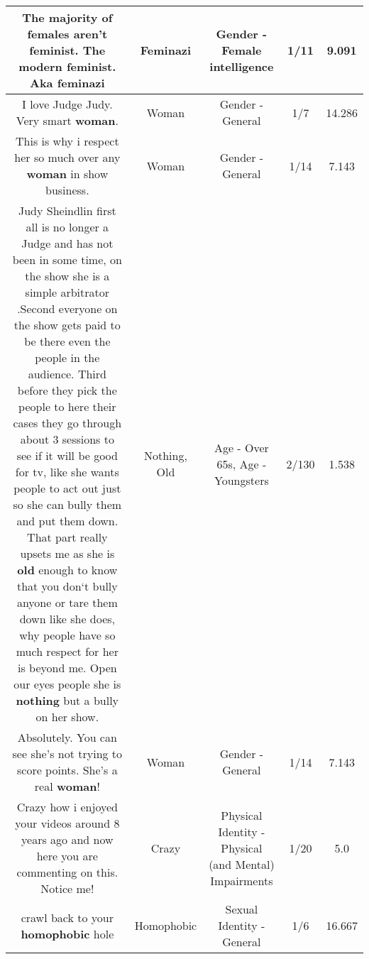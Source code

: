 \documentclass[11pt]{article}
\newlength\mylength
\begin{document}
\begin{center}
\begin{longtable}{|C{.65\mylength}|C{.30\mylength}|C{.12\mylength}|C{.12\mylength}|C{.12\mylength}|}
  \small The majority of females aren't feminist. The modern feminist. Aka feminazi\normalsize   & Feminazi & Gender - Female intelligence & 1/11 & 9.091 \\  \hline
  \small I love Judge Judy. Very smart \textbf{woman}.\normalsize   & Woman & Gender - General & 1/7 & 14.286 \\  \hline
  \small This is why i respect her so much over any \textbf{woman} in show business.\normalsize   & Woman & Gender - General & 1/14 & 7.143 \\  \hline
  \small Judy Sheindlin first all is no longer a Judge and has not been in some time, on the show she is a simple arbitrator .Second everyone on the show gets paid to be there even the people in the audience. Third before they pick the people to here their cases they go through about 3 sessions to see if it will be good for tv, like she wants people to act out just so she can bully them and put them down. That part really upsets me as she is \textbf{old} enough to know that you don`t bully anyone or tare them down like she does, why people have so much respect for her is beyond me. Open our eyes people she is \textbf{nothing} but a bully on her show.\normalsize   & Nothing, Old & Age - Over 65s, Age - Youngsters & 2/130 & 1.538 \\  \hline
  \small Absolutely. You can see she's not trying to score points. She's a real \textbf{woman}!\normalsize   & Woman & Gender - General & 1/14 & 7.143 \\  \hline
  \small Crazy how i enjoyed your videos around 8 years ago and now here you are commenting on this. Notice me!\normalsize   & Crazy & Physical Identity - Physical (and Mental) Impairments & 1/20 & 5.0 \\  \hline
  \small crawl back to your \textbf{homophobic} hole\normalsize   & Homophobic & Sexual Identity - General & 1/6 & 16.667 \\  \hline

\end{longtable}
\end{center}
\end{document}
